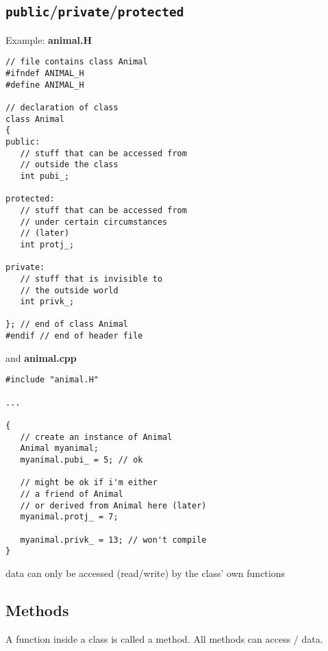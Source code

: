 \subsection{\texttt{public}/\texttt{private}/\texttt{protected}}
Example: \textbf{animal.H}\\
\begin{boxedminipage}{\linewidth}
\begin{verbatim}
// file contains class Animal
#ifndef ANIMAL_H
#define ANIMAL_H

// declaration of class
class Animal
{
public:
   // stuff that can be accessed from
   // outside the class
   int pubi_;

protected:
   // stuff that can be accessed from
   // under certain circumstances
   // (later)
   int protj_;
   
private:
   // stuff that is invisible to
   // the outside world
   int privk_;
   
}; // end of class Animal
#endif // end of header file
\end{verbatim}
\end{boxedminipage}
and \textbf{animal.cpp}\\
\begin{boxedminipage}{\linewidth}
\begin{verbatim}
#include "animal.H"

...

{
   // create an instance of Animal
   Animal myanimal;
   myanimal.pubi_ = 5; // ok

   // might be ok if i'm either
   // a friend of Animal
   // or derived from Animal here (later)
   myanimal.protj_ = 7;
   
   myanimal.privk_ = 13; // won't compile
}
\end{verbatim}
\end{boxedminipage}
 data can only be accessed (read/write)
by the class' own functions

\subsection{Methods}
A function inside a class is called a method.
All methods can access / data.

